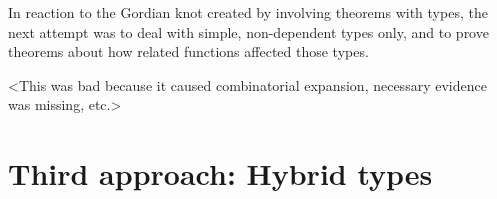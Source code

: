 \documentclass[preprint]{sigplanconf}
\begin{document}
In reaction to the Gordian knot created by involving theorems with types, the
next attempt was to deal with simple, non-dependent types only, and to prove
theorems about how related functions affected those types.

<This was bad because it caused combinatorial expansion, necessary evidence
was missing, etc.>

\section{Third approach: Hybrid types}

% 
% 
% 
% 
% 
% 
% 
% 
% 
% 
% 
% 
% 
% 
% 
\end{document}

